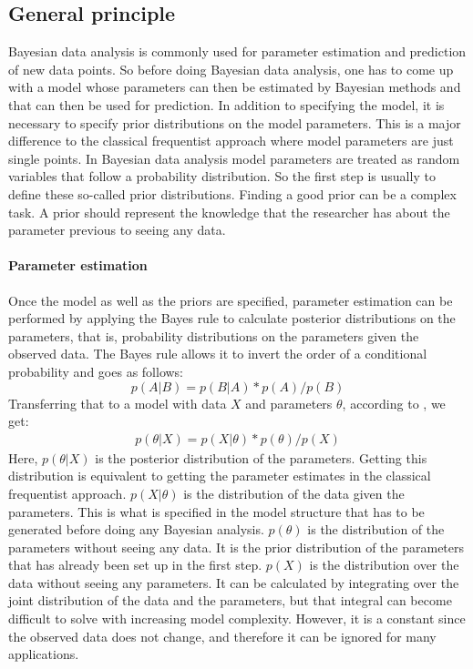 \documentclass{article}
\begin{document}
\subsection{General principle}
\label{subsec: General principle}
Bayesian data analysis is commonly used for parameter estimation and prediction of new data points. So before doing Bayesian data analysis, one has to come up with a model whose parameters can then be estimated by Bayesian methods and that can then be used for prediction. In addition to specifying the model, it is necessary to specify prior distributions on the model parameters. This is a major difference to the classical frequentist approach where model parameters are just single points. In Bayesian data analysis model parameters are treated as random variables that follow a probability distribution. So the first step is usually to define these so-called prior distributions. Finding a good prior can be a complex task. A prior should represent the knowledge that the researcher has about the parameter previous to seeing any data.
\paragraph{Parameter estimation}
Once the model as well as the priors are specified, parameter estimation can be performed by applying the Bayes rule to calculate posterior distributions on the parameters, that is, probability distributions on the parameters given the observed data. The Bayes rule allows it to invert the order of a conditional probability and goes as follows:
\begin{equation}
p(A|B) = p(B|A) * p(A)/p(B)
\end{equation}
Transferring that to a model with data $X$ and parameters $\theta$, according to \cite{1439840954}, we get:
\begin{equation}
\begin{split}
p(\theta|X) = p(X|\theta) * p(\theta)/p(X)
\end{split}
\end{equation}
Here, $p(\theta|X)$ is the posterior distribution of the parameters. Getting this distribution is equivalent to getting the parameter estimates in the classical frequentist approach. $p(X|\theta)$ is the distribution of the data given the parameters. This is what is specified in the model structure that has to be generated before doing any Bayesian analysis. $p(\theta)$ is the distribution of the parameters without seeing any data. It is the prior distribution of the parameters that has already been set up in the first step. $p(X)$ is the distribution over the data without seeing any parameters. It can be calculated by integrating over the joint distribution of the data and the parameters, but that integral can become difficult to solve with increasing model complexity. However, it is a constant since the observed data does not change, and therefore it can be ignored for many applications.
\end{document}

